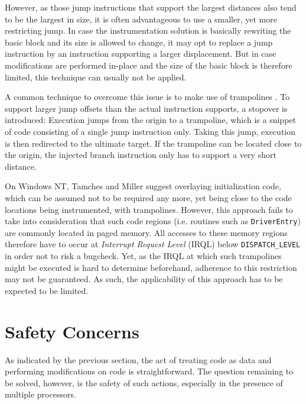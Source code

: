 However, as those jump instructions that support the largest distances also 
tend to be the largest in size, it is often advantageous to use a smaller, 
yet more restricting jump. In case the instrumentation solution 
is basically rewriting the basic block and its size is allowed to 
change, it may opt to replace a jump instruction by an instruction 
supporting a larger displacement. But in case modifications are performed in-place and the 
size of the basic block is therefore limited, this technique can usually not be applied.

A common technique to overcome this issue is to make use of
trampolines \cite{tamches99finegrained}. To support larger jump offsets than the actual
instruction supports, a stopover is introduced: Execution jumps
from the origin to a trampoline, which is a snippet of code consisting of
a single jump instruction only. Taking this jump, execution is then redirected to the
ultimate target. If the trampoline can be located close to the
origin, the injected branch instruction only has to support a very short distance.

On Windows NT, Tamches and Miller \cite{tamches99finegrained} suggest overlaying
initialization code, which can be assumed not to be required any more, yet being close
to the code locations being instrumented, with trampolines.
However, this approach fails to take into consideration that such code regions (i.e.
routines such as \verb|DriverEntry|) are commonly located in paged memory. All accesses
to these memory regions therefore have to occur at \emph{Interrupt Request Level} (IRQL) 
below \verb|DISPATCH_LEVEL| in order not to risk a bugcheck. Yet, as the IRQL at which such 
trampolines might be executed is hard to determine beforehand, adherence to this restriction
may not be guaranteed. As such, the applicability of this approach has to be expected to be limited.



\section{Safety Concerns}
\label{sec:SafetyConcerns}
As indicated by the previous section, the act of treating code as data and performing
modifications on code is straightforward. The question remaining to be solved, however, is the
safety of such actions, especially in the presence of multiple processors.

